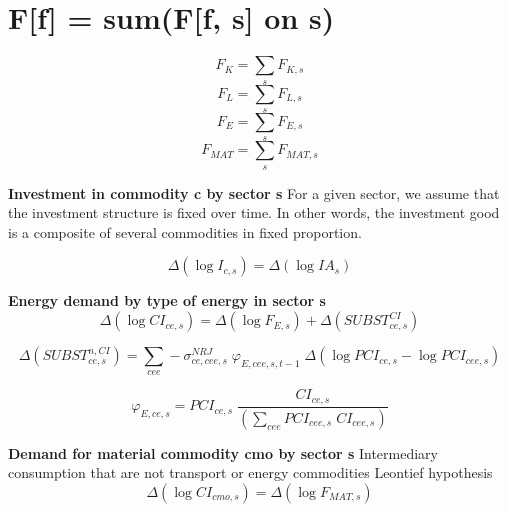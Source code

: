 \documentclass[12pt]{article}
\numberwithin{equation}{section}
\begin{document}
\section{F[f] = sum(F[f, s] on s)}



\begin{dmath}
F_{K} = \sum_{s} F_{K, s}
\end{dmath}
\begin{dmath}
F_{L} = \sum_{s} F_{L, s}
\end{dmath}
\begin{dmath}
F_{E} = \sum_{s} F_{E, s}
\end{dmath}
\begin{dmath}
F_{MAT} = \sum_{s} F_{MAT, s}
\end{dmath}

\textbf{Investment in commodity c by sector s}
For a given sector, we assume that the investment structure is fixed over time. In other words, the investment good is a composite of several commodities in fixed proportion.

\begin{dmath}
\varDelta \left(\operatorname{log} I_{c, s}\right) = \varDelta \left(\operatorname{log} IA_{s}\right)
\end{dmath}

\textbf{Energy demand by type of energy in sector s}
\begin{dmath}
\varDelta \left(\operatorname{log} CI_{ce, s}\right) = \varDelta \left(\operatorname{log} F_{E, s}\right) + \varDelta \left(SUBST^{CI}_{ce, s}\right)
\end{dmath}

\begin{dmath}
\varDelta \left(SUBST^{n,CI}_{ce, s}\right) = \sum_{cee} -\sigma^{NRJ}_{ce, cee, s} \; \varphi_{E, cee, s, t-1} \; \varDelta \left(\operatorname{log} PCI_{ce, s} - \operatorname{log} PCI_{cee, s}\right)
\end{dmath}

\begin{dmath}
\varphi_{E, ce, s} = PCI_{ce, s} \; \frac{CI_{ce, s}}{\left( \sum_{cee} PCI_{cee, s} \; CI_{cee, s} \right)}
\end{dmath}

\textbf{Demand for material commodity cmo by sector s}
Intermediary consumption that are not transport or energy commodities
Leontief hypothesis
\begin{dmath}
\varDelta \left(\operatorname{log} CI_{cmo, s}\right) = \varDelta \left(\operatorname{log} F_{MAT, s}\right)
\end{dmath}
\end{document}
